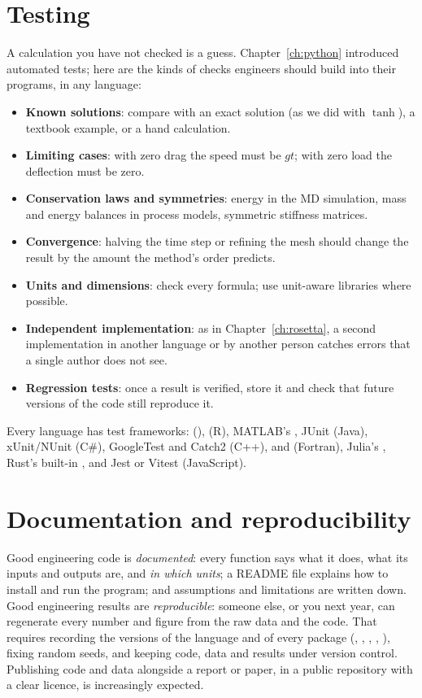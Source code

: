 \section{Testing}

A calculation you have not checked is a guess. Chapter~\ref{ch:python} introduced
automated tests; here are the kinds of checks engineers should build into their programs,
in any language:
\begin{itemize}
\item \textbf{Known solutions}: compare with an exact solution (as we did with
  $\tanh$), a textbook example, or a hand calculation.
\item \textbf{Limiting cases}: with zero drag the speed must be $gt$; with zero load the
  deflection must be zero.
\item \textbf{Conservation laws and symmetries}: energy in the MD simulation, mass and
  energy balances in process models, symmetric stiffness matrices.
\item \textbf{Convergence}: halving the time step or refining the mesh should change the
  result by the amount the method's order predicts.
\item \textbf{Units and dimensions}: check every formula; use unit-aware libraries where
  possible.
\item \textbf{Independent implementation}: as in Chapter~\ref{ch:rosetta}, a second
  implementation in another language or by another person catches errors that a single
  author does not see.
\item \textbf{Regression tests}: once a result is verified, store it and check that future
  versions of the code still reproduce it.
\end{itemize}
Every language has test frameworks:  (\py),  (R), MATLAB's
, JUnit (Java), xUnit/NUnit (C\#), GoogleTest and Catch2 (C++),
 and  (Fortran), Julia's , Rust's built-in
, and Jest or Vitest (JavaScript).

\section{Documentation and reproducibility}

Good engineering code is \emph{documented}: every function says what it does, what its
inputs and outputs are, and \emph{in which units}; a README file explains how to install
and run the program; and assumptions and limitations are written down. Good engineering
results are \emph{reproducible}: someone else, or you next year, can regenerate every
number and figure from the raw data and the code. That requires recording the versions of
the language and of every package (, ,
, , ), fixing random seeds, and keeping
code, data and results under version control. Publishing code and data alongside a report
or paper, in a public repository with a clear licence, is increasingly expected.


